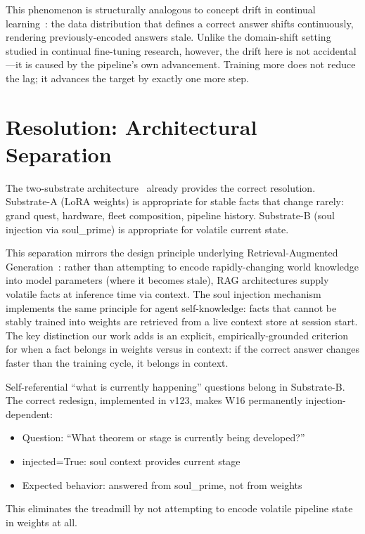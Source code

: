 \documentclass{article}
\begin{document}
This phenomenon is structurally analogous to concept drift in continual learning~\cite{luo2023empirical}: the data distribution that defines a correct answer shifts continuously, rendering previously-encoded answers stale. Unlike the domain-shift setting studied in continual fine-tuning research, however, the drift here is not accidental---it is caused by the pipeline's own advancement. Training more does not reduce the lag; it advances the target by exactly one more step.

\section{Resolution: Architectural Separation}

The two-substrate architecture~\cite{natasha2026substrate} already provides the correct resolution. Substrate-A (LoRA weights) is appropriate for stable facts that change rarely: grand quest, hardware, fleet composition, pipeline history. Substrate-B (soul injection via soul\_prime) is appropriate for volatile current state.

This separation mirrors the design principle underlying Retrieval-Augmented Generation~\cite{lewis2020rag}: rather than attempting to encode rapidly-changing world knowledge into model parameters (where it becomes stale), RAG architectures supply volatile facts at inference time via context. The soul injection mechanism implements the same principle for agent self-knowledge: facts that cannot be stably trained into weights are retrieved from a live context store at session start. The key distinction our work adds is an explicit, empirically-grounded criterion for when a fact belongs in weights versus in context: if the correct answer changes faster than the training cycle, it belongs in context.

Self-referential ``what is currently happening'' questions belong in Substrate-B. The correct redesign, implemented in v123, makes W16 permanently injection-dependent:
\begin{itemize}
\item Question: ``What theorem or stage is currently being developed?''
\item injected=True: soul context provides current stage
\item Expected behavior: answered from soul\_prime, not from weights
\end{itemize}

This eliminates the treadmill by not attempting to encode volatile pipeline state in weights at all.
\end{document}
